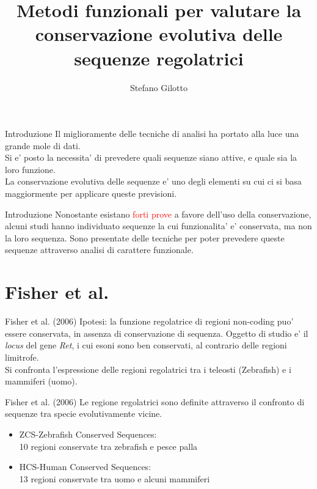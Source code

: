 \documentclass{beamer}
\title{Metodi funzionali per valutare la conservazione evolutiva delle sequenze regolatrici}
\author{Stefano Gilotto}
\institute{Universita' degli studi di Torino\\Dipartimento di Biotecnologie Molecolari e Scinze per la Salute}
\newcommand{\warn}[1]{\textcolor{red}{#1}}
\begin{document}
    \maketitle

    \begin{frame}{Introduzione}
        Il miglioramente delle tecniche di analisi ha portato alla luce una grande mole di dati.\\
        Si e' posto la necessita' di prevedere quali sequenze siano attive, e quale sia la loro
        funzione.\\
        La conservazione evolutiva delle sequenze e' uno degli elementi su cui ci si basa maggiormente
        per applicare queste previsioni.
    \end{frame}


    \begin{frame}{Introduzione}
        Nonostante esistano \warn{forti prove} a favore dell'uso della conservazione,
        alcuni studi hanno individuato sequenze la cui funzionalita' e' conservata,
        ma non la loro sequenza.
        Sono presentate delle tecniche per poter prevedere queste sequenze attraverso
        analisi di carattere funzionale.
    \end{frame}

    \section{Fisher et al.}

    \begin{frame}{Fisher et al. (2006)}
        Ipotesi: la funzione regolatrice di regioni non-coding puo' essere conservata,
        in assenza di conservazione di sequenza.
        Oggetto di studio e' il \emph{locus} del gene \emph{Ret}, i cui esoni sono ben conservati,
        al contrario delle regioni limitrofe.\\
        Si confronta l'espressione delle regioni regolatrici tra i teleosti (Zebrafish) e i mammiferi (uomo).\\
    \end{frame}


    \begin{frame}{Fisher et al. (2006)}
        Le regione regolatrici sono definite attraverso il confronto di sequenze
        tra specie evolutivamente vicine.
        \begin{itemize}
            \item ZCS-Zebrafish Conserved Sequences:\\
            10 regioni conservate tra zebrafish e pesce palla
            \item HCS-Human Conserved Sequences:\\
            13 regioni conservate tra uomo e alcuni mammiferi
        \end{itemize}
    \end{frame}
\end{document}
